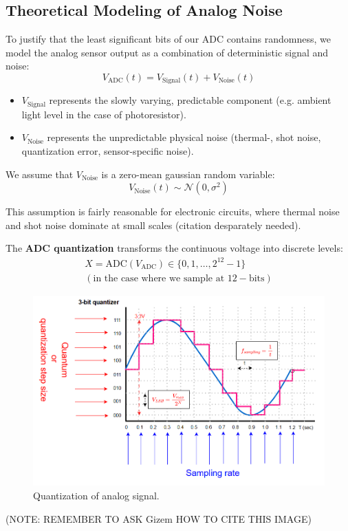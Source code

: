 \newpage
\subsection{Theoretical Modeling of Analog Noise} 
To justify that the least significant bits of our ADC contains 
randomness, we model the analog sensor output as a combination of 
deterministic signal and noise: 
\[ 
    V_{\text{ADC}}(t) = V_{\text{Signal}}(t) + V_{\text{Noise}}(t)
\]

\begin{itemize}
    \item \(V_{\text{Signal}}\) represents the slowly varying, 
        predictable component (e.g. ambient light level in the case 
        of photoresistor). 
    \item \(V_{\text{Noise}}\) represents the unpredictable physical 
        noise (thermal-, shot noise, quantization error, 
        sensor-specific noise).
\end{itemize}

We assume that $V_{\text{Noise}}$ is a zero-mean gaussian random 
variable: 
\[ 
    V_{\text{Noise}}(t) \sim \mathcal N(0, \sigma^2) 
\]

This assumption is fairly reasonable for electronic circuits, 
where thermal noise and shot noise dominate at small scales 
(citation desparately needed).

The \textbf{ADC quantization} transforms the continuous voltage 
into discrete levels: 
\begin{align*}
    X = \text{ADC}(V_{\text{ADC}}) \in \{0,1,\dots,2^{12}-1\}
    \\
    (\text{in the case where we sample at } 12-\text{bits})
\end{align*}


\begin{figure}[h]
    \centering
    \includegraphics[width=0.8\linewidth]{./images/quantization.png} 
    \caption{Quantization of analog signal.}
    \label{fig:quantization} 
\end{figure}
(NOTE: REMEMBER TO ASK Gizem HOW TO CITE THIS IMAGE)

